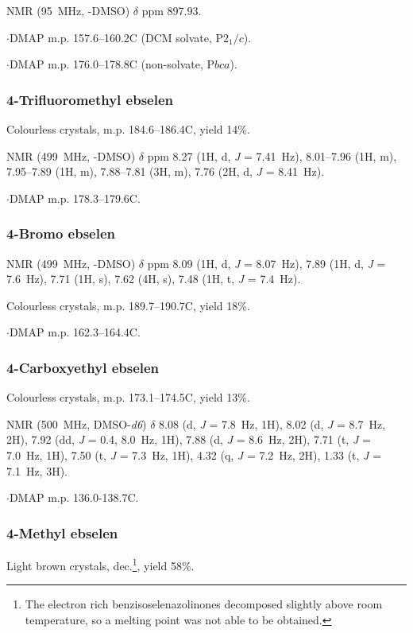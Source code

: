 \begin{refsection}
 NMR (95~MHz, -DMSO) $\delta$ ppm 897.93.

$\cdot$DMAP m.p. 157.6--160.2\degree C (DCM solvate, P$2_1/c$).

$\cdot$DMAP m.p. 176.0--178.8\degree C (non-solvate, P$bca$).


\subsubsection{4-Trifluoromethyl ebselen }
Colourless crystals, m.p. 184.6--186.4\degree C, yield 14\%.

 NMR (499~MHz, -DMSO) $\delta$ ppm 8.27 (1H, d, \emph{J} = 7.41~Hz), 8.01--7.96 (1H, m), 7.95--7.89 (1H, m), 7.88--7.81 (3H, m), 7.76 (2H, d, \emph{J} = 8.41~Hz).

$\cdot$DMAP m.p. 178.3--179.6\degree C.


\subsubsection{4-Bromo ebselen } 

 NMR (499~MHz, -DMSO) $\delta$ ppm 8.09 (1H, d, \emph{J} = 8.07~Hz), 7.89 (1H, d, \emph{J} = 7.6~Hz), 7.71 (1H, s), 7.62 (4H, s), 7.48 (1H, t, \emph{J} = 7.4~Hz).

Colourless crystals, m.p. 189.7--190.7\degree C, yield 18\%.

$\cdot$DMAP m.p. 162.3--164.4\degree C.


\subsubsection{4-Carboxyethyl ebselen }
Colourless crystals, m.p. 173.1--174.5\degree C, yield 13\%.

 NMR (500~MHz, DMSO-\emph{d6}) $\delta$ 8.08 (d, \emph{J} = 7.8~Hz, 1H), 8.02 (d, \emph{J} = 8.7~Hz, 2H), 7.92 (dd, \emph{J} = 0.4, 8.0~Hz, 1H), 7.88 (d, \emph{J} = 8.6~Hz, 2H), 7.71 (t, \emph{J} = 7.0~Hz, 1H), 7.50 (t, \emph{J} = 7.3~Hz, 1H), 4.32 (q, \emph{J} = 7.2~Hz, 2H), 1.33 (t, \emph{J} = 7.1~Hz, 3H).

$\cdot$DMAP m.p. 136.0-138.7\degree C.


\subsubsection{4-Methyl ebselen }
Light brown crystals, dec.\footnote{\label{fn:decompose} The electron rich benzisoselenazolinones decomposed slightly above room temperature, so a melting point was not able to be obtained.}, yield 58\%.


\end{refsection}
